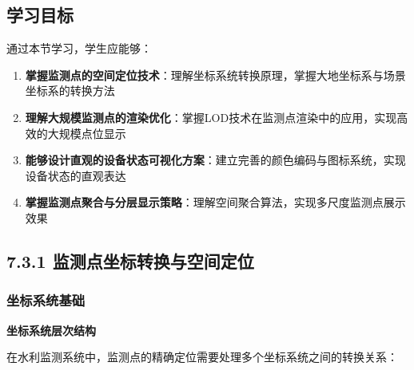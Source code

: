 \subsection{学习目标}\label{ux5b66ux4e60ux76eeux6807-3}

通过本节学习，学生应能够：

\begin{enumerate}
\def\labelenumi{\arabic{enumi}.}
\tightlist
\item
  \textbf{掌握监测点的空间定位技术}：理解坐标系统转换原理，掌握大地坐标系与场景坐标系的转换方法
\item
  \textbf{理解大规模监测点的渲染优化}：掌握LOD技术在监测点渲染中的应用，实现高效的大规模点位显示
\item
  \textbf{能够设计直观的设备状态可视化方案}：建立完善的颜色编码与图标系统，实现设备状态的直观表达
\item
  \textbf{掌握监测点聚合与分层显示策略}：理解空间聚合算法，实现多尺度监测点展示效果
\end{enumerate}

\subsection{7.3.1 监测点坐标转换与空间定位}\label{ux76d1ux6d4bux70b9ux5750ux6807ux8f6cux6362ux4e0eux7a7aux95f4ux5b9aux4f4d}

\subsubsection{坐标系统基础}\label{ux5750ux6807ux7cfbux7edfux57faux7840}

\textbf{坐标系统层次结构}

在水利监测系统中，监测点的精确定位需要处理多个坐标系统之间的转换关系：

